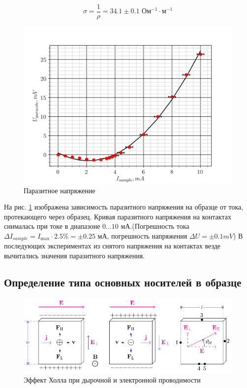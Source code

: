 \begin{equation}
	\sigma=\frac{1}{\rho}=34.1\pm0.1 \text{ Ом$^{-1}\cdot$м$^{-1}$}
\end{equation}

\begin{figure}[h!]
	\centering
		\includegraphics[width = .8\linewidth]{graphs/paraz.png}
		\caption{Паразитное напряжение}
		\label{fig:5.3}
\end{figure}
	
На рис. \ref{fig:5.3} изображена зависимость паразитного напряжения на образце от тока, протекающего через образец.
Кривая паразитного напряжения на контактах снималась при токе в диапазоне $0\ldots10$ мА.(Погрешность тока $\Delta
I_{sample} = I_{\max}\cdot 2.5\% = \pm 0.25 \text{ мА}$, погрешность напряжения $\Delta U = \pm 0.1 mV$)
В последующих экспериментах из снятого напряжения на контактах везде вычитались значения паразитного напряжения.

\subsection*{Определение типа основных носителей в образце}

\begin{figure}[h!]
	\centering
	\includegraphics[width=\linewidth]{fig/effect.pdf}
	\caption{Эффект Холла при дырочной и электронной проводимости}
	\label{fig:hall}
\end{figure}

